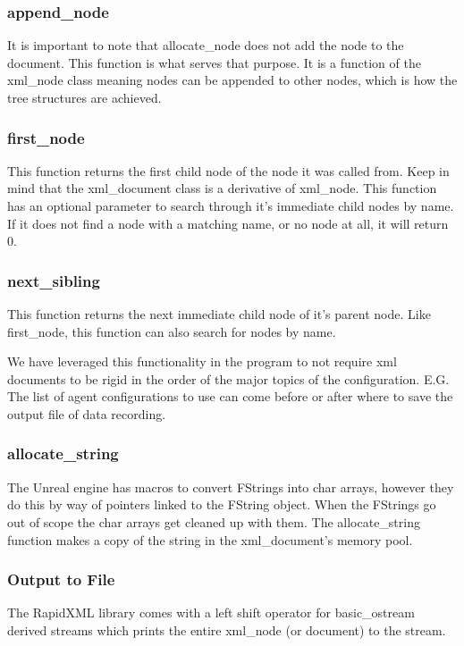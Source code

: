 \documentclass[../main.tex]{subfiles}
\begin{document}
\subsubsection{append\_node}
It is important to note that allocate\_node does not add the node to the document.
This function is what serves that purpose.
It is a function of the xml\_node class meaning nodes can be appended to other nodes, which is how the tree structures are achieved.

\subsubsection{first\_node}
This function returns the first child node of the node it was called from.
Keep in mind that the xml\_document class is a derivative of xml\_node.
This function has an optional parameter to search through it's immediate child nodes by name.
If it does not find a node with a matching name, or no node at all, it will return 0.

\subsubsection{next\_sibling}
This function returns the next immediate child node of it's parent node.
Like first\_node, this function can also search for nodes by name.

We have leveraged this functionality in the program to not require xml documents to be rigid in the order of the major topics of the configuration.
E.G. The list of agent configurations to use can come before or after where to save the output file of data recording.

\subsubsection{allocate\_string}
The Unreal engine has macros to convert FStrings into char arrays, however they do this by way of pointers linked to the FString object.
When the FStrings go out of scope the char arrays get cleaned up with them.
The allocate\_string function makes a copy of the string in the xml\_document's memory pool.

\subsubsection{Output to File}
The RapidXML library comes with a left shift operator for basic\_ostream derived streams which prints the entire xml\_node (or document) to the stream.
\end{document}
